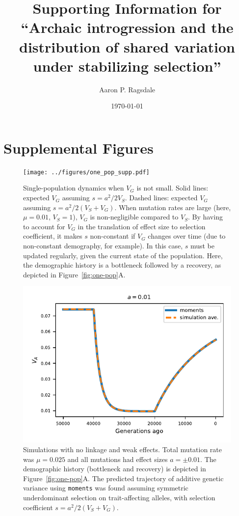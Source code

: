 \documentclass[]{article}
\title{Supporting Information for\\
``Archaic introgression and the distribution
of shared variation under stabilizing selection''}
\author[]{Aaron P. Ragsdale}
\affil[]{Department of Integrative Biology, University of Wisconsin--Madison, WI, USA}
\date{\today}
\newcommand{\moments}{\texttt{moments}\xspace}
\begin{document}
\maketitle

\renewcommand{\thesection}{S\arabic{section}}
\renewcommand{\thetable}{S\arabic{table}}
\renewcommand{\thefigure}{S\arabic{figure}}

\section{Supplemental Figures}

\begin{figure}[ht!]
    \centering
    \texttt{[image: ../figures/one\_pop\_supp.pdf]}
    \caption{
        Single-population dynamics when $V_G$ is not small.
        Solid lines: expected $V_G$ assuming $s=a^2/2V_S$. Dashed lines:
        expected $V_G$ assuming $s=a^2/2(V_S+V_G)$. When mutation rates
        are large (here, $\mu=0.01$, $V_S=1$), $V_G$ is non-negligible
        compared to $V_S$. By having to account for $V_G$ in the
        translation of effect size to selection coefficient, it makes
        $s$ non-constant if $V_G$ changes over time (due to non-constant
        demography, for example). In this case, $s$ must be updated
        regularly, given the current state of the population.
        Here, the demographic history is a bottleneck followed by a
        recovery, as depicted in Figure~\ref{fig:one-pop}A.
    }
    \label{fig:supp-one-pop}
\end{figure}

\begin{figure}[ht!]
    \centering
    \includegraphics{../figures/one_pop.a_0.01.pdf}
    \caption{
        Simulations with no linkage and weak effects.
        Total mutation rate was $\mu=0.025$ and all mutations had effect
        sizes $a=\pm 0.01$. The demographic history (bottleneck and
        recovery) is depicted in Figure~\ref{fig:one-pop}A. The predicted
        trajectory of additive genetic variance using \moments was found
        assuming symmetric underdominant selection on trait-affecting
        alleles, with selection coefficient $s=a^2/2(V_S+V_G)$.
    }
    \label{fig:one-pop-0.01}
\end{figure}
\end{document}
